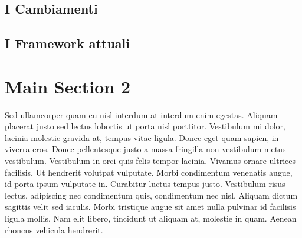 \subsection{I Cambiamenti}
\subsection{I Framework attuali}


\section{Main Section 2}

Sed ullamcorper quam eu nisl interdum at interdum enim egestas. Aliquam placerat justo sed lectus lobortis ut porta nisl porttitor. Vestibulum mi dolor, lacinia molestie gravida at, tempus vitae ligula. Donec eget quam sapien, in viverra eros. Donec pellentesque justo a massa fringilla non vestibulum metus vestibulum. Vestibulum in orci quis felis tempor lacinia. Vivamus ornare ultrices facilisis. Ut hendrerit volutpat vulputate. Morbi condimentum venenatis augue, id porta ipsum vulputate in. Curabitur luctus tempus justo. Vestibulum risus lectus, adipiscing nec condimentum quis, condimentum nec nisl. Aliquam dictum sagittis velit sed iaculis. Morbi tristique augue sit amet nulla pulvinar id facilisis ligula mollis. Nam elit libero, tincidunt ut aliquam at, molestie in quam. Aenean rhoncus vehicula hendrerit.